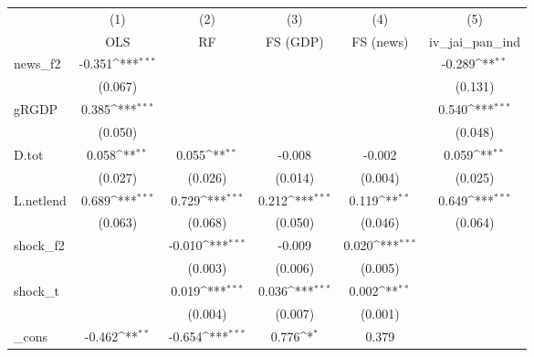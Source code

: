 {
\def\sym#1{\ifmmode^{#1}\else\(^{#1}\)\fi}
\begin{tabular}{l*{5}{c}}
\toprule
            &\multicolumn{1}{c}{(1)}&\multicolumn{1}{c}{(2)}&\multicolumn{1}{c}{(3)}&\multicolumn{1}{c}{(4)}&\multicolumn{1}{c}{(5)}\\
            &\multicolumn{1}{c}{OLS}&\multicolumn{1}{c}{RF}&\multicolumn{1}{c}{FS (GDP)}&\multicolumn{1}{c}{FS (news)}&\multicolumn{1}{c}{iv\_jai\_pan\_ind}\\
\midrule
news\_f2     &      -0.351\sym{***}&                     &                     &                     &      -0.289\sym{**} \\
            &     (0.067)         &                     &                     &                     &     (0.131)         \\
\addlinespace
gRGDP       &       0.385\sym{***}&                     &                     &                     &       0.540\sym{***}\\
            &     (0.050)         &                     &                     &                     &     (0.048)         \\
\addlinespace
D.tot       &       0.058\sym{**} &       0.055\sym{**} &      -0.008         &      -0.002         &       0.059\sym{**} \\
            &     (0.027)         &     (0.026)         &     (0.014)         &     (0.004)         &     (0.025)         \\
\addlinespace
L.netlend   &       0.689\sym{***}&       0.729\sym{***}&       0.212\sym{***}&       0.119\sym{**} &       0.649\sym{***}\\
            &     (0.063)         &     (0.068)         &     (0.050)         &     (0.046)         &     (0.064)         \\
\addlinespace
shock\_f2    &                     &      -0.010\sym{***}&      -0.009         &       0.020\sym{***}&                     \\
            &                     &     (0.003)         &     (0.006)         &     (0.005)         &                     \\
\addlinespace
shock\_t     &                     &       0.019\sym{***}&       0.036\sym{***}&       0.002\sym{**} &                     \\
            &                     &     (0.004)         &     (0.007)         &     (0.001)         &                     \\
\addlinespace
\_cons      &      -0.462\sym{**} &      -0.654\sym{***}&       0.776\sym{*}  &       0.379         &                     \\

\end{tabular}}
